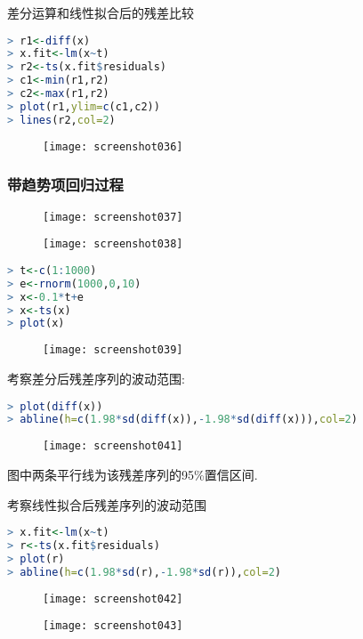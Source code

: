 \documentclass[11pt,a4paper,oneside]{book}
\begin{document}
差分运算和线性拟合后的残差比较
\begin{lstlisting}[language=r]
> r1<-diff(x)
> x.fit<-lm(x~t)
> r2<-ts(x.fit$residuals)
> c1<-min(r1,r2)
> c2<-max(r1,r2)
> plot(r1,ylim=c(c1,c2))
> lines(r2,col=2)
\end{lstlisting}
\begin{figure}[H]
	\texttt{[image: screenshot036]}
	\label{fig:screenshot036}
\end{figure}

\subsubsection{带趋势项回归过程}
\begin{figure}[H]
	\texttt{[image: screenshot037]}
	\label{fig:screenshot037}
\end{figure}
\begin{figure}[H]
	\texttt{[image: screenshot038]}
	\label{fig:screenshot038}
\end{figure}

\begin{lstlisting}[language=r]
> t<-c(1:1000)
> e<-rnorm(1000,0,10)
> x<-0.1*t+e
> x<-ts(x)
> plot(x)
\end{lstlisting}
\begin{figure}[H]
	\texttt{[image: screenshot039]}
	\label{fig:screenshot039}
\end{figure}

考察差分后残差序列的波动范围:
\begin{lstlisting}[language=r]
> plot(diff(x))
> abline(h=c(1.98*sd(diff(x)),-1.98*sd(diff(x))),col=2)
\end{lstlisting}
\begin{figure}[H]
	\texttt{[image: screenshot041]}
	\label{fig:screenshot041}
\end{figure}

图中两条平行线为该残差序列的95\%置信区间.

考察线性拟合后残差序列的波动范围
\begin{lstlisting}[language=r]
> x.fit<-lm(x~t)
> r<-ts(x.fit$residuals)
> plot(r)
> abline(h=c(1.98*sd(r),-1.98*sd(r)),col=2)
\end{lstlisting}
\begin{figure}[H]
	\texttt{[image: screenshot042]}
	\label{fig:screenshot042}
\end{figure}
\begin{figure}[H]
	\texttt{[image: screenshot043]}
	\label{fig:screenshot043}
\end{figure}
\end{document}
